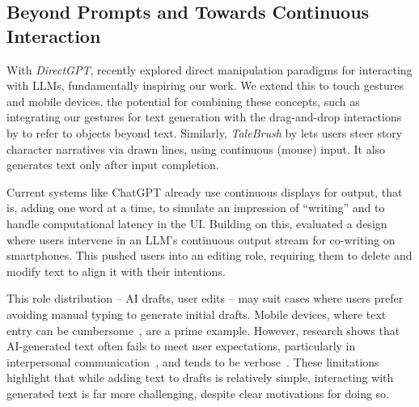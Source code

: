 \subsection{Beyond Prompts and Towards Continuous Interaction}
With \textit{DirectGPT}, \citet{directGPT} recently explored direct manipulation paradigms for interacting with LLMs, fundamentally inspiring our work. 
We extend this to touch gestures and mobile devices.  the potential for combining these concepts, such as integrating our gestures for text generation with the drag-and-drop interactions by \citet{directGPT} to refer to objects beyond text.
Similarly, \textit{TaleBrush} by \citet{Chung2022taleBrush} lets users steer story character narratives via drawn lines, using continuous (mouse) input. It also generates text only after input completion.








Current systems like ChatGPT already use continuous displays for output, that is, adding one word at a time, to simulate an impression of ``writing'' and to handle computational latency in the UI.
Building on this, \citet{Lehmann2022suggVsCont} evaluated a design where users intervene in an LLM's continuous output stream for co-writing on smartphones. This pushed users into an editing role, requiring them to delete and modify text to align it with their intentions.

This role distribution -- AI drafts, user edits -- may suit cases where users prefer avoiding manual typing to generate initial drafts. Mobile devices, where text entry can be cumbersome~\cite{Kristensson2014inviscid}, are a prime example. 
However, research shows that AI-generated text often fails to meet user expectations, particularly in interpersonal communication~\cite{Fu2024texttoself, Liu2022aimailperception, Robertson2021cantreply}, and tends to be verbose~\cite{Fu2024texttoself}. These limitations highlight that while adding text to drafts is relatively simple, interacting with generated text is far more challenging, despite clear motivations for doing so.


